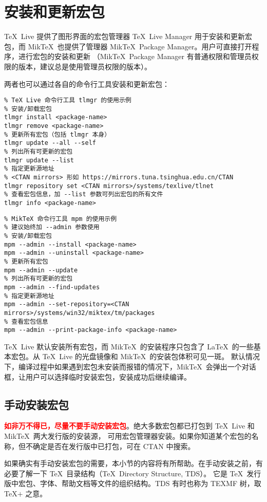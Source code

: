 \section{安装和更新宏包}\label{sec:pkg-manager}

\TeX\ Live 提供了图形界面的宏包管理器 \TeX\ Live Manager 用于安装和更新宏包，而 Mik\-\TeX\ 也提供了管理器
Mik\-\TeX\ Package Manager。用户可直接打开程序，进行宏包的安装和更新
（Mik\-\TeX\ Package Manager 有普通权限和管理员权限的版本，建议总是使用管理员权限的版本）。

两者也可以通过各自的命令行工具安装和更新宏包：
\begin{verbatim}
% TeX Live 命令行工具 tlmgr 的使用示例
% 安装/卸载宏包
tlmgr install <package-name>
tlmgr remove <package-name>
% 更新所有宏包（包括 tlmgr 本身）
tlmgr update --all --self
% 列出所有可更新的宏包
tlmgr update --list
% 指定更新源地址
% <CTAN mirrors> 形如 https://mirrors.tuna.tsinghua.edu.cn/CTAN
tlmgr repository set <CTAN mirrors>/systems/texlive/tlnet
% 查看宏包信息，加 --list 参数可列出宏包的所有文件
tlmgr info <package-name>
\end{verbatim}

\begin{verbatim}
% MikTeX 命令行工具 mpm 的使用示例
% 建议始终加 --admin 参数使用
% 安装/卸载宏包
mpm --admin --install <package-name>
mpm --admin --uninstall <package-name>
% 更新所有宏包
mpm --admin --update
% 列出所有可更新的宏包
mpm --admin --find-updates
% 指定更新源地址
mpm --admin --set-repository=<CTAN mirrors>/systems/win32/miktex/tm/packages
% 查看宏包信息
mpm --admin --print-package-info <package-name>
\end{verbatim}

\TeX\ Live 默认安装所有宏包，而 Mik\TeX\ 的安装程序只包含了 \LaTeX\ 的一些基本宏包。从 \TeX\ Live 的光盘镜像和 Mik\-\TeX\ 的安装包体积可见一斑。
默认情况下，编译过程中如果遇到宏包未安装而报错的情况下，Mik\TeX\ 会弹出一个对话框，让用户可以选择临时安装宏包，安装成功后继续编译。

\subsection{手动安装宏包}\label{subsec:pkg-manual-install}

\textbf{\textcolor{red}{如非万不得已，尽量不要手动安装宏包}}。绝大多数宏包都已打包到 \TeX\ Live 和 Mik\TeX\ 两大发行版的安装源，
可用宏包管理器安装。如果你知道某个宏包的名称，但不确定是否在发行版中已打包，可在 CTAN 中搜索。

如果确实有手动安装宏包的需要，本小节的内容将有所帮助。在手动安装之前，有必要了解一下 \TeX\ 目录结构（\TeX\ Directory Structure, TDS）。
它是 \TeX\ 发行版中宏包、字体、帮助文档等文件的组织结构。TDS 有时也称为 TEXMF 树，取 \TeX$+$ 之意。

